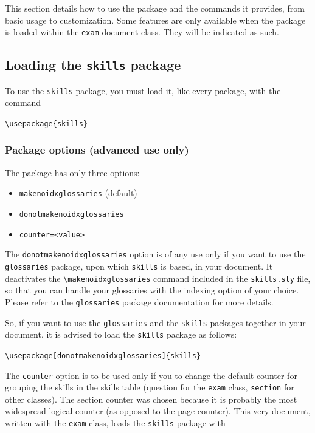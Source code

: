 \documentclass[12pt]{exam}
\begin{document}
This section details how to use the package and the commands it provides,
from basic usage to customization. Some features are only available when
the package is loaded within the \verb|exam| document class. They will be
indicated as such.
\subsection{Loading the \texttt{skills} package}
\label{sec:UsageLoadingPackage}

To use the \verb|skills| package, you must load it, like every package,
with the command
\begin{center}
  \verb"\usepackage{skills}"
\end{center}

\subsubsection*{Package options (advanced use only)}
The package has only three options:
\begin{itemize}
	\item \verb|makenoidxglossaries| (default)
	\item \verb|donotmakenoidxglossaries|
	\item \verb|counter=<value>|
\end{itemize}

The \verb|donotmakenoidxglossaries| option is of any use only if you want to
use the \verb|glossaries| package, upon which \verb|skills| is based,
in your document. It deactivates the \verb|\makenoidxglossaries| command included in the \verb|skills.sty| file,
so that you can handle your glossaries with the indexing option of your
choice. Please refer to the \verb|glossaries| package documentation for
more details.

So, if you want to use the \verb|glossaries| and the \verb|skills| packages
together in your document, it is advised to load the \verb|skills| package 
as follows:
\begin{center}
	\verb|\usepackage[donotmakenoidxglossaries]{skills}|
\end{center}

The \verb|counter| option is to be used only if you to change the default counter for grouping the skills in the skills table (question for the \verb|exam| class, \verb|section| for other classes). The section counter was chosen because it is probably the most widespread logical counter (as opposed to the page counter). This very document, written with the \verb|exam| class, loads the \verb|skills| package with
\end{document}
